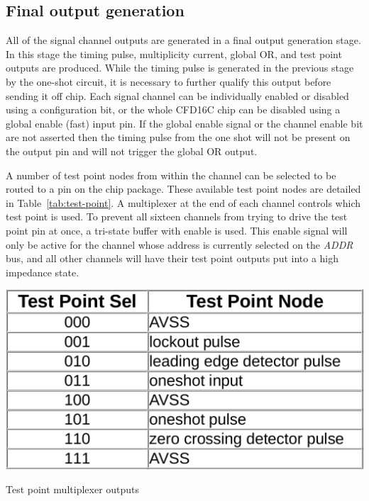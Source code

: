 \documentclass[12pt,oneside,final]{siuethesis}
\theoremstyle{definition}
\begin{document}
\subsection{Final output generation}
\par All of the signal channel outputs are generated in a final output generation stage. In this stage the timing pulse, multiplicity current, global OR, and test point outputs are produced. While the timing pulse is generated in the previous stage by the one-shot circuit, it is necessary to further qualify this output before sending it off chip. Each signal channel can be individually enabled or disabled using a configuration bit, or the whole CFD16C chip can be disabled using a global enable (fast) input pin. If the global enable signal or the channel enable bit are not asserted then the timing pulse from the one shot will not be present on the output pin and will not trigger the global OR output. 

\par A number of test point nodes from within the channel can be selected to be routed to a pin on the chip package. These available test point nodes are detailed in Table~\ref{tab:test-point}. A multiplexer at the end of each channel controls which test point is used. To prevent all sixteen channels from trying to drive the test point pin at once, a tri-state buffer with enable is used. This enable signal will only be active for the channel whose address is currently selected on the \emph{ADDR} bus, and all other channels will have their test point outputs put into a high impedance state.  

\begin{table}[ht]
 \centering
 \includegraphics[scale=.2,keepaspectratio=true]{../data/test_points.png}
 \caption{Test point multiplexer outputs}
 \label{tab:test-point}
\end{table}
\end{document}
